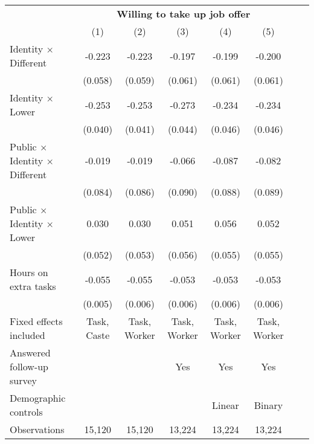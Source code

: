          \def\sym#1{\ifmmode^{#1}\else\(^{#1}\)\fi}         \begin{tabular}{l*{7}{c}}         \toprule          & \multicolumn{5}{c}{\textbf{Willing to take up job offer}} \bigstrut \\         \cline{2-6} \addlinespace
                    &\multicolumn{1}{c}{(1)}&\multicolumn{1}{c}{(2)}&\multicolumn{1}{c}{(3)}&\multicolumn{1}{c}{(4)}&\multicolumn{1}{c}{(5)}\\
\midrule
Identity $\times$ Different&      -0.223&      -0.223&      -0.197&      -0.199&      -0.200\\
                    &     (0.058)&     (0.059)&     (0.061)&     (0.061)&     (0.061)\\
\addlinespace
Identity $\times$ Lower&      -0.253&      -0.253&      -0.273&      -0.234&      -0.234\\
                    &     (0.040)&     (0.041)&     (0.044)&     (0.046)&     (0.046)\\
\addlinespace
Public $\times$ Identity $\times$ Different&      -0.019&      -0.019&      -0.066&      -0.087&      -0.082\\
                    &     (0.084)&     (0.086)&     (0.090)&     (0.088)&     (0.089)\\
\addlinespace
Public $\times$ Identity $\times$ Lower&       0.030&       0.030&       0.051&       0.056&       0.052\\
                    &     (0.052)&     (0.053)&     (0.056)&     (0.055)&     (0.055)\\
\addlinespace
Hours on extra tasks&      -0.055&      -0.055&      -0.053&      -0.053&      -0.053\\
                    &     (0.005)&     (0.006)&     (0.006)&     (0.006)&     (0.006)\\
\midrule
Fixed effects included& Task, Caste&Task, Worker&Task, Worker&Task, Worker&Task, Worker\\
Answered follow-up survey&            &            &         Yes&         Yes&         Yes\\
Demographic controls&            &            &            &      Linear&      Binary\\
Observations        &      15,120&      15,120&      13,224&      13,224&      13,224\\
\bottomrule
\end{tabular}
